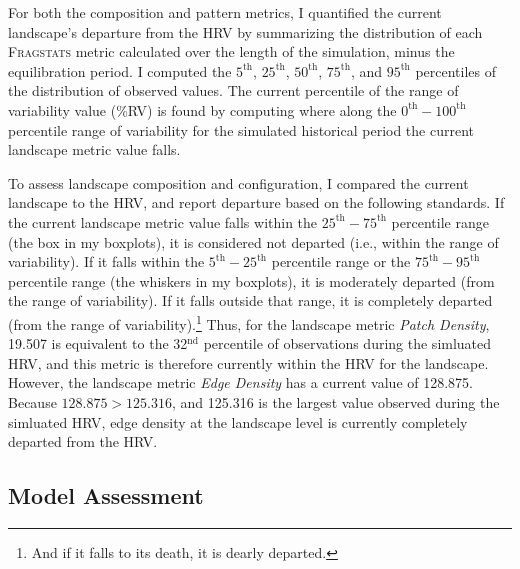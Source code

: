 For both the composition and pattern metrics, I quantified the current landscape's departure from the HRV by summarizing the distribution of each \textsc{Fragstats} metric calculated over the length of the simulation, minus the equilibration period. I computed the $5^{\text{th}}$, $25^{\text{th}}$, $50^{\text{th}}$, $75^{\text{th}}$, and $95^{\text{th}}$ percentiles of the distribution of observed values. The current percentile of the range of variability value (\%RV) is found by computing where along the $0^{\text{th}}-100^{\text{th}}$ percentile range of variability for the simulated historical period the current landscape metric value falls. 

To assess landscape composition and configuration, I compared the current landscape to the HRV, and report departure based on the following standards. If the current landscape metric value falls within the $25^{\text{th}}-75^{\text{th}}$ percentile range (the box in my boxplots), it is considered not departed (i.e., within the range of variability). If it falls within the $5^{\text{th}}-25^{\text{th}}$ percentile range or the $75^{\text{th}}-95^{\text{th}}$ percentile range (the whiskers in my boxplots), it is moderately departed (from the range of variability). If it falls outside that range, it is completely departed (from the range of variability).\footnote{And if it falls to its death, it is dearly departed.} Thus, for the landscape metric \emph{Patch Density}, 19.507 is equivalent to the 32$^{\text{nd}}$ percentile of observations during the simluated HRV, and this metric is therefore currently within the HRV for the landscape. However, the landscape metric \emph{Edge Density} has a current value of 128.875. Because $128.875 > 125.316$, and 125.316 is the largest value observed during the simluated HRV, edge density at the landscape level is currently completely departed from the HRV. 

\clearpage

\subsection{Model Assessment}
\label{subsec:modelassessment}

